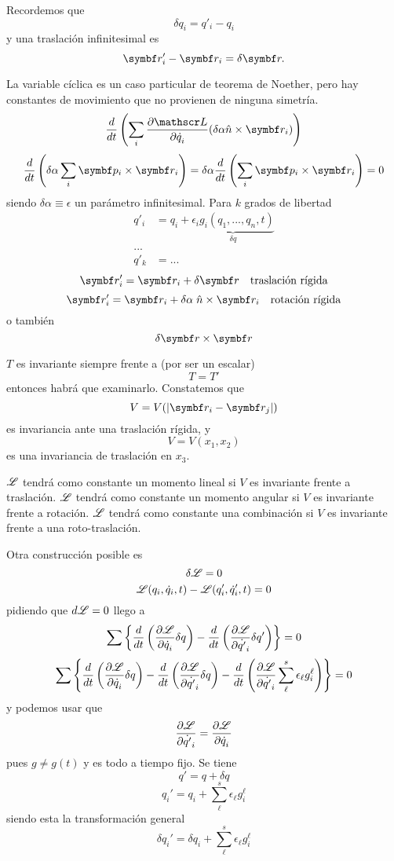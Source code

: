 \documentclass[10pt,oneside]{CBFT_book}
\begin{document}
Recordemos que 
\[
	\delta q_i = q'_i - q_i 
\]
y una traslación infinitesimal es 
\[
	\vb{r}_i' - \vb{r}_i = \delta \vb{r}. 
\]

La variable cíclica es un caso particular de teorema de Noether, pero hay constantes de movimiento que 
no provienen de ninguna simetría.
\[
	\frac{d}{dt}\left( \sum_i \dpar{\Lag}{\dot{q}_i} ( \delta \alpha \hat{n}\times \vb{r}_i ) \right) 
\]
\[
	\frac{d}{dt}\left( \delta\alpha \sum_i \vb{p}_i \times \vb{r}_i  \right) =
	\delta\alpha \frac{d}{dt}\left(  \sum_i \vb{p}_i \times \vb{r}_i  \right) = 0
\]
siendo $\delta \alpha \equiv \epsilon$ un parámetro infinitesimal.
Para $k$ grados de libertad
\begin{align*}
	q'_i &= q_i + \underbrace{\epsilon_i g_i(q_1,...,q_n,t)}_{\delta q} \\
	... \\
	q'_k &= ...
\end{align*}
\[
	\vb{r}_i' = \vb{r}_i + \delta\vb{r} \quad \textrm{traslación rígida}
\]
\[
	\vb{r}_i' = \vb{r}_i + \delta\alpha \; \hat{n}\times\vb{r}_i \quad \textrm{rotación rígida}
\]
o también 
\[
	\delta \vb{r} \times \vb{r}
\]

$T$ es invariante siempre frente a (por ser un escalar)
\[
	T = T' 
\]
entonces habrá que examinarlo.
Constatemos que 
\[
	V = V(|\vb{r}_i - \vb{r}_j|)
\]
es invariancia ante una traslación rígida, y
\[
	V = V(x_1,x_2)
\]
es una invariancia de traslación en $x_3$.

$\mathscr{L}$ tendrá como constante un momento lineal si $V$ es invariante frente a traslación.
$\mathscr{L}$ tendrá como constante un momento angular si $V$ es invariante frente a rotación.
$\mathscr{L}$ tendrá como constante una combinación si $V$ es invariante frente a una roto-traslación.

Otra construcción posible es 
\[
	\delta \mathscr{L} = 0
\]
\[
	\mathscr{L}( q_i , \dot{q}_i, t ) - \mathscr{L}(q_i' , \dot{q}_i' , t) = 0 
\]
pidiendo que $d\mathscr{L} = 0$ llego a 
\[
	\sum \left\{ \frac{d}{dt}\left( \frac{\partial^{\hspace{-0.05em}} {\mathscr{L}}}{\partial {\dot{q}_i}^{\hspace{-0.05em}}} \delta q \right) - 
	\frac{d}{dt}\left( \frac{\partial^{\hspace{-0.05em}} {\mathscr{L}}}{\partial {\dot{q'}_i}^{\hspace{-0.05em}}} \delta q' \right)  \right\} = 0
\]
\[
	\sum \left\{ \frac{d}{dt}\left( \frac{\partial^{\hspace{-0.05em}} {\mathscr{L}}}{\partial {\dot{q}_i}^{\hspace{-0.05em}}} \delta q \right) - 
	\frac{d}{dt}\left( \frac{\partial^{\hspace{-0.05em}} {\mathscr{L}}}{\partial {\dot{q'}_i}^{\hspace{-0.05em}}} \delta q \right) -
	\frac{d}{dt}\left( \frac{\partial^{\hspace{-0.05em}} {\mathscr{L}}}{\partial {\dot{q'}_i}^{\hspace{-0.05em}}} \sum_\ell^s \epsilon_\ell g_i^\ell \right) \right\} = 0
\]
y podemos usar que 
\[
	\frac{\partial^{\hspace{-0.05em}} {\mathscr{L}}}{\partial {\dot{q'}_i}^{\hspace{-0.05em}}} = \frac{\partial^{\hspace{-0.05em}} {\mathscr{L}}}{\partial {\dot{q}_i}^{\hspace{-0.05em}}}
\]
pues $g\neq g(t)$ y es todo a tiempo fijo. Se tiene 
\[
	q' = q + \delta q
\]
\[
	q_i' = q_i + \sum_\ell^s \epsilon_\ell g_i^\ell
\]
siendo esta la transformación general
\[
	\delta q_i' = \delta q_i + \sum_\ell^s \epsilon_\ell g_i^\ell
\]
\end{document}
